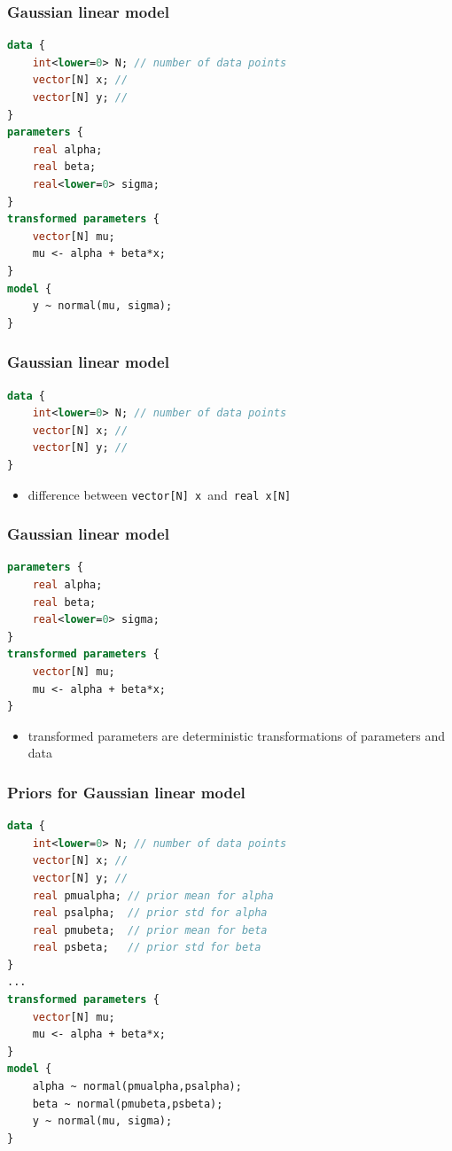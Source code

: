 \documentclass[10pt,handout]{beamer}
\begin{document}
\begin{frame}[fragile]

\frametitle{Gaussian linear model}
  {\small
  \begin{lstlisting}[language=Stan]
data {
    int<lower=0> N; // number of data points
    vector[N] x; //
    vector[N] y; //
}
parameters {
    real alpha;
    real beta;
    real<lower=0> sigma;
}
transformed parameters {
    vector[N] mu;
    mu <- alpha + beta*x;
}
model {
    y ~ normal(mu, sigma);
}
  \end{lstlisting}
}
\end{frame}

\begin{frame}[fragile]

\frametitle{Gaussian linear model}
  {\small
  \begin{lstlisting}[language=Stan]
data {
    int<lower=0> N; // number of data points
    vector[N] x; //
    vector[N] y; //
}
\end{lstlisting}
  }

  \begin{itemize}
  \item difference between {\tt vector[N] x}\, and\, {\tt real x[N]}
  \end{itemize}
\end{frame}

\begin{frame}[fragile]

\frametitle{Gaussian linear model}
  {\small
  \begin{lstlisting}[language=Stan]
parameters {
    real alpha;
    real beta;
    real<lower=0> sigma;
}
transformed parameters {
    vector[N] mu;
    mu <- alpha + beta*x;
}
\end{lstlisting}
  }
  \begin{itemize}
  \item transformed parameters are deterministic transformations of parameters and data
  \end{itemize}
\end{frame}

\begin{frame}[fragile]

\frametitle{Priors for Gaussian linear model}
  {\small
  \begin{lstlisting}[language=Stan]
data {
    int<lower=0> N; // number of data points
    vector[N] x; //
    vector[N] y; //
    real pmualpha; // prior mean for alpha
    real psalpha;  // prior std for alpha
    real pmubeta;  // prior mean for beta
    real psbeta;   // prior std for beta
}
...
transformed parameters {
    vector[N] mu;
    mu <- alpha + beta*x;
}
model {
    alpha ~ normal(pmualpha,psalpha);
    beta ~ normal(pmubeta,psbeta);
    y ~ normal(mu, sigma);
}
  \end{lstlisting}
}
\end{frame}
\end{document}

